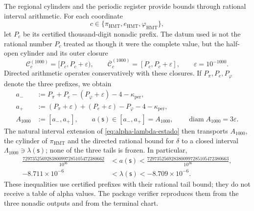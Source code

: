 The regional cylinders and the periodic register provide bounds through
rational interval arithmetic. For each coordinate
\[
 c\in\{\pi_{\mathrm{HMT}},e_{\mathrm{HMT}},\varphi_{\mathrm{HMT}}\},
\]
let \(P_c\) be its certified thousand-digit nonadic prefix. The datum used
is not the rational number \(P_c\) treated as though it were the complete value, but the
half-open cylinder and its outer closure
\[
 \mathcal C_c^{(1000)}=[P_c,P_c+\varepsilon),
 \qquad
 \overline{\mathcal C}_c^{(1000)}=[P_c,P_c+\varepsilon],
 \qquad \varepsilon=10^{-1000}.
\]
Directed arithmetic operates conservatively with these closures. If
\(P_\pi,P_e,P_\varphi\) denote the three prefixes, we obtain
\begin{equation}
\begin{aligned}
 a_-&:=P_\pi+P_e-(P_\varphi+\varepsilon)-4-
       \kappa_{\mathrm{per}},\\
 a_+&:=(P_\pi+\varepsilon)+(P_e+\varepsilon)-P_\varphi-4-
       \kappa_{\mathrm{per}},\\
 A_{1000}&:=[a_-,a_+],
 \qquad a(\mathsf s)\in[a_-,a_+]=A_{1000},
 \qquad \operatorname{diam}A_{1000}=3\varepsilon.
\end{aligned}
\label{eq:alpha-propagacion-colas-rev08}
\end{equation}
The natural interval extension of
\eqref{eq:alpha-lambda-estado} then transports \(A_{1000}\), the cylinder
of \(\pi_{\mathrm{HMT}}\) and the directed rational bound for \(\delta\) to a
closed interval \(\Lambda_{1000}\ni\lambda(\mathsf s)\); none of the three
tails is frozen. In particular,
\begin{equation}
\begin{aligned}
 \frac{7297352569283800997285105472380662}{10^{36}}
 &<a(\mathsf s)<
 \frac{7297352569283800997285105472380663}{10^{36}},\\
 -8.711\mathbin{\times}10^{-6}
 &<\lambda(\mathsf s)<-8.709\mathbin{\times}10^{-6}.
\end{aligned}
 \label{eq:alpha-cotas-precoordenada-lambda}
\end{equation}
These inequalities use certified prefixes with their rational tail
bound; they do not receive a table of alpha values. The package verifier reproduces
them from the three nonadic outputs and from the terminal chart.

